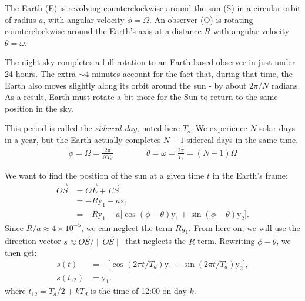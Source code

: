 \documentclass[12pt]{article}
\begin{document}
The Earth (E) is revolving counterclockwise around the sun (S) in a circular 
orbit of radius $a$, with angular velocity $\dot \phi=\Omega$.
An observer (O) is rotating counterclockwise around the Earth's axis at a 
distance $R$ with angular velocity $\dot \theta=\omega$.

The night sky completes a full rotation to an Earth-based observer in just 
under 24 hours. The extra $\sim 4$ minutes account for the fact that, during 
that time, the Earth also moves slightly along its orbit around the sun - by
about $2\pi/N$ radians. As a result, Earth must rotate a bit more for the 
Sun to return to the same position in the sky.

This period is called the \textit{sidereal day}, noted here $T_s$. 
We experience $N$ solar days in a year, but the Earth actually completes $N+1$ 
sidereal days in the same time.
\begin{align}
    \dot\phi = \Omega = \frac{2\pi}{N T_d} \qquad\qquad
    \dot\theta = \omega = \frac{2\pi}{T_s} = (N+1) \Omega
\end{align}

We want to find the position of the sun at a given time $t$ in the Earth's 
frame:
\begin{equation}
    \begin{aligned}
        \overrightarrow{OS} &= \overrightarrow{OE} + \overrightarrow{ES}\\
        &= -R \mathrm{y}_1 - a \mathrm{x}_1\\
        &= -R \mathrm{y}_1 - a \Big[\cos(\phi-\theta) \mathrm{y}_1 + \sin(\phi-\theta) \mathrm{y}_2\Big].
    \end{aligned}
\end{equation}
Since $R/a \approx 4\times 10^{-5}$, we can neglect the term $R y_1$. 
From here on, we will use the direction vector 
$s\approx \overrightarrow{OS}/\|\overrightarrow{OS}\|$ that neglects
the $R$ term. Rewriting $\phi-\theta$, we then get:
\begin{align}
    s(t) &= -\Big[\cos(2\pi t/T_d) \mathrm{y}_1 + \sin(2\pi t/T_d) \mathrm{y}_2\Big],\\
    s(t_{12}) &= \mathrm{y}_1.
\end{align}
where $t_{12}=T_d/2 + kT_d$ is the time of 12:00 on day $k$.
\end{document}
